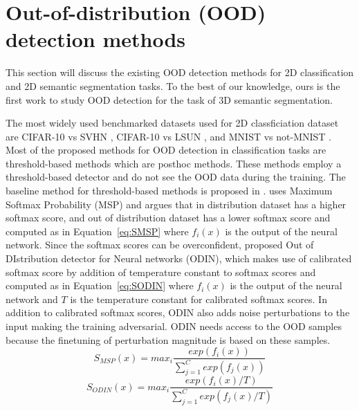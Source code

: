     
    
    \section{Out-of-distribution (OOD) detection methods}
    This section will discuss the existing OOD detection methods for 2D classification and 2D semantic segmentation tasks.
    To the best of our knowledge, ours is the first work to study OOD detection for the task of 3D semantic segmentation.

    The most widely used benchmarked datasets used for 2D classficiation dataset are CIFAR-10 vs SVHN \cite{liang2017enhancing_ODIN}, CIFAR-10 vs LSUN \cite{hendrycks2016baseline_MSP}, and MNIST vs not-MNIST \cite{hendrycks2016baseline_MSP}. 
    Most of the proposed methods for OOD detection in classification tasks are threshold-based methods which are posthoc methods.
    These methods employ a threshold-based detector and do not see the OOD data during the training.
    The baseline method for threshold-based methods is proposed in \cite{hendrycks2016baseline_MSP}.
    \cite{hendrycks2016baseline_MSP} uses Maximum Softmax Probability (MSP) and argues that in distribution dataset has a higher softmax score, and out of distribution dataset has a lower softmax score and computed as in Equation~\ref{eq:SMSP} where $f_i(x)$ is the output of the neural network.
    Since the softmax scores can be overconfident, \cite{liang2017enhancing_ODIN} proposed Out of DIstribution detector for Neural networks (ODIN), which makes use of calibrated softmax score by addition of temperature constant to softmax scores and computed as in Equation~\ref{eq:SODIN} where $f_i(x)$ is the output of the neural network and $T$ is the temperature constant for calibrated softmax scores.
    In addition to calibrated softmax scores, ODIN also adds noise perturbations to the input making the training adversarial.
    ODIN needs access to the OOD samples because the finetuning of perturbation magnitude is based on these samples.
    \begin{equation}
        S_{MSP}(x) = max_i \frac{exp(f_i(x))}{\sum^{C}_{j=1}exp(f_j(x))}  \label{eq:SMSP}
    \end{equation}
    \begin{equation}
        S_{ODIN}(x) = max_i \frac{exp(f_i(x)/T)}{\sum^{C}_{j=1}exp(f_j(x)/T)}  \label{eq:SODIN}
    \end{equation}
